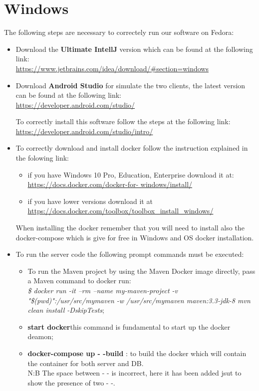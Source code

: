 \section{Windows}
The following steps are necessary to correctely run our software on Fedora:
\begin{itemize}
	\item Download the \textbf{Ultimate IntellJ} version which can be found at the following link:\\
 		\url{https://www.jetbrains.com/idea/download/\#section=windows}

	\item Download \textbf{Android Studio} for simulate the two clients, the latest version can be found at the following link:\\
		\url{https://developer.android.com/studio/}

		To correctly install this software follow the steps at the following link:\\
		\url{https://developer.android.com/studio/intro/}

	\item To correctly download and install docker follow the instruction explained in the folowing link:\\
		\begin{itemize}
		\item if you have Windows 10 Pro, Education, Enterprise download it at: \url{https://docs.docker.com/docker-for-					windows/install/}\\
		\item if you have lower versions download it at \url{https://docs.docker.com/toolbox/toolbox_install_windows/}
		\end{itemize}
	When installing the docker remember that you will need to install also the docker-compose which is give for free in Windows 			and OS docker installation.

	\item To run the server code the following prompt commands must be executed:\\
		\begin{itemize}
			\item To run the  Maven project by using the Maven Docker image directly, pass a Maven command to docker 					run:\\
\textit{\$ docker run -it --rm --name my-maven-project -v "\$(pwd)":/usr/src/mymaven -w /usr/src/mymaven maven:3.3-jdk-8 mvn clean install -DskipTests};
			\item \textbf{start docker}this command is fundamental to start up the docker deamon;	
			\item \textbf{ docker-compose up - -build} : to build the docker which will contain the container for both server 					and DB.\\N:B The space between - - is incorrect, here it has been added jsut to show the presence of two - -.
		\end{itemize}


\end{itemize}
